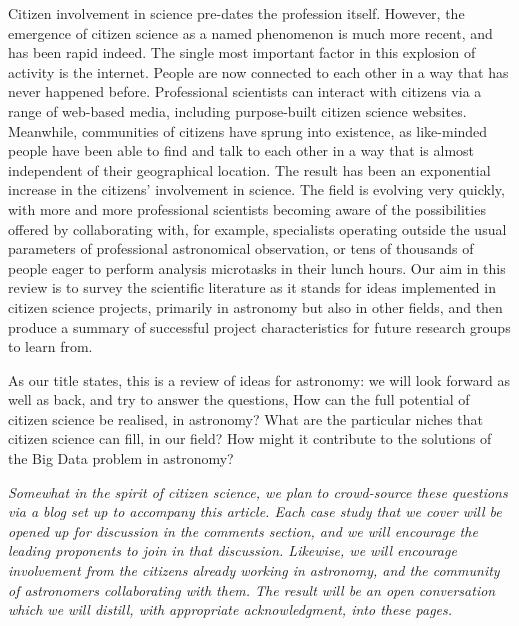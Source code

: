 \documentclass{ar2e}
\begin{document}
Citizen involvement in science pre-dates the profession itself. However, the
emergence of citizen science as a named phenomenon is much more recent, and has
been rapid indeed. The single most important factor in this explosion of
activity is the internet. People are now connected to each other in a way that
has never happened before. Professional scientists can interact with citizens
via a range of web-based media, including purpose-built citizen science
websites. Meanwhile, communities of citizens have sprung into existence, as
like-minded people have been able to find and talk to each other in a way that
is almost independent of their geographical location. The result has been an
exponential increase in the citizens' involvement in science. The field is
evolving very quickly, with more and more professional scientists becoming aware
of the possibilities offered by collaborating with, for example, specialists
operating outside the usual parameters of professional astronomical observation,
or tens of thousands of people eager to perform analysis microtasks in their
lunch hours.  Our aim in this review is to survey the scientific literature as
it stands for ideas implemented in citizen science projects, primarily in
astronomy but also in other fields, and then produce a summary of successful
project characteristics for future research groups to learn from.

As our title states, this is a review of ideas for astronomy: we will look
forward as well as back, and try to answer the questions, How can the full
potential of citizen science be realised, in astronomy? What are the particular
niches that citizen science can fill, in our field? How might it contribute to
the solutions of the Big Data problem in astronomy?

{\it Somewhat in the spirit of citizen science, we plan to crowd-source these
questions via a blog set up to accompany this article.  Each case study that we
cover will be opened up for discussion in the comments section, and we will
encourage the leading proponents to join in that discussion. Likewise, we will
encourage involvement from the citizens already working in astronomy, and the 
community of astronomers collaborating with them. The result will be an open
conversation which we will distill, with appropriate acknowledgment, into these
pages.}
\end{document}

